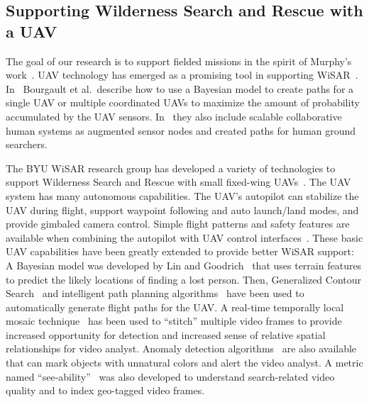 \subsection{Supporting Wilderness Search and Rescue with a UAV}

The goal of our research is to support fielded missions in the spirit of Murphy's work~\cite{Casper2003Human}. UAV technology has emerged as a promising tool in supporting WiSAR~\cite{Murphy2008Cooperative,Bourgault2003Coordinated}. In~\cite{Bourgault2006Optimal, Bourgault2004Coordinated} Bourgault et al.\ describe how to use a Bayesian model to create paths for a single UAV or multiple coordinated UAVs to maximize the amount of probability accumulated by the UAV sensors. In~\cite{Bourgault2008AugmentedNodes} they also include scalable collaborative human systems as augmented sensor nodes and created paths for human ground searchers.

The BYU WiSAR research group has developed a variety of technologies to support Wilderness Search and Rescue with small fixed-wing UAVs~\cite{Beard2005Autonomous, Goodrich2008Supporting, Goodrich2009Towards, Lin2010Supporting}. The UAV system has many autonomous capabilities. The UAV's autopilot can stabilize the UAV during flight, support waypoint following and auto launch/land modes, and provide gimbaled camera control. Simple flight patterns and safety features are available when combining the autopilot with UAV control interfaces~\cite{Beard2005Autonomous, Lin2010Supporting}. These basic UAV capabilities have been greatly extended to provide better WiSAR support: A Bayesian model was developed by Lin and Goodrich~\cite{Lin2010Bayesian} that uses terrain features to predict the likely locations of finding a lost person. Then, Generalized Contour Search~\cite{Goodrich2008Supporting} and intelligent path planning algorithms~\cite{Lin2009UAV,Niedfeldt2010integrated} have been used to automatically generate flight paths for the UAV. A real-time temporally local mosaic technique~\cite{Morse2008Application} has been used to ``stitch'' multiple video frames to provide increased opportunity for detection and increased sense of relative spatial relationships for video analyst. Anomaly detection algorithms~\cite{Thornton2011Unusual} are also available that can mark objects with unnatural colors and alert the video analyst. A metric named ``see-ability''~\cite{Morse2010UAV} was also developed to understand search-related video quality and to index geo-tagged video frames. 

